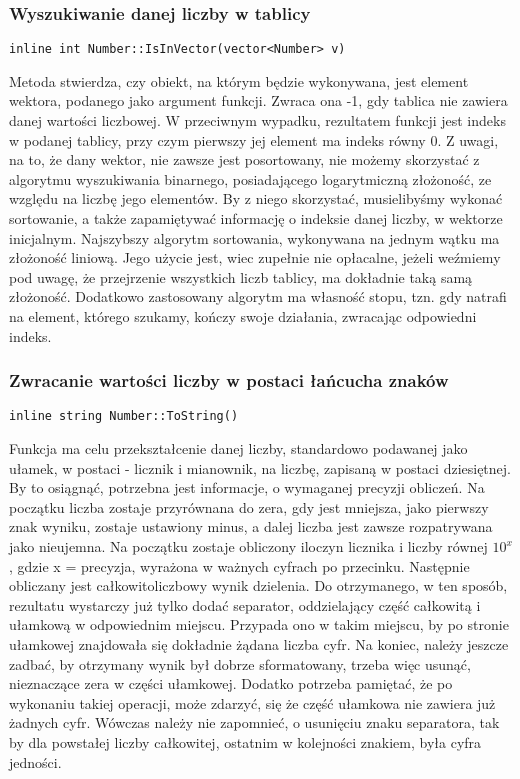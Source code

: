 \documentclass[twoside,a4paper]{book}
\begin{document}
\subsubsection{Wyszukiwanie danej liczby w tablicy}
\begin{lstlisting}
inline int Number::IsInVector(vector<Number> v)
\end{lstlisting}

Metoda stwierdza, czy obiekt, na którym będzie wykonywana, jest element wektora, podanego jako argument funkcji. Zwraca ona -1, gdy tablica nie zawiera danej wartości liczbowej. W przeciwnym wypadku, rezultatem funkcji jest indeks w podanej tablicy, przy czym pierwszy jej element ma indeks równy 0. Z uwagi, na to, że dany wektor, nie zawsze jest posortowany, nie możemy skorzystać z algorytmu wyszukiwania binarnego, posiadającego logarytmiczną złożoność, ze względu na liczbę jego elementów. By z niego skorzystać, musielibyśmy wykonać sortowanie, a także zapamiętywać informację o indeksie danej liczby, w wektorze inicjalnym. Najszybszy algorytm sortowania, wykonywana na jednym wątku ma złożoność liniową. Jego użycie jest, wiec zupełnie nie opłacalne, jeżeli weźmiemy pod uwagę, że przejrzenie wszystkich liczb tablicy, ma dokładnie taką samą złożoność. Dodatkowo zastosowany algorytm ma własność stopu, tzn. gdy natrafi na element, którego szukamy, kończy swoje działania, zwracając odpowiedni indeks.
\\

\subsubsection{Zwracanie wartości liczby w postaci łańcucha znaków}
\begin{lstlisting}
inline string Number::ToString()
\end{lstlisting}

Funkcja ma celu przekształcenie danej liczby, standardowo podawanej jako ułamek, w postaci - licznik i mianownik, na liczbę, zapisaną w postaci dziesiętnej. By to osiągnąć, potrzebna jest informacje, o wymaganej precyzji obliczeń. Na początku liczba zostaje przyrównana do zera, gdy jest mniejsza, jako pierwszy znak wyniku, zostaje ustawiony minus, a dalej liczba jest zawsze rozpatrywana jako nieujemna. Na początku zostaje obliczony iloczyn licznika i liczby równej $10^x$, gdzie x = precyzja, wyrażona w ważnych cyfrach po przecinku. Następnie obliczany jest całkowitoliczbowy wynik dzielenia. Do otrzymanego, w ten sposób, rezultatu wystarczy już tylko dodać separator, oddzielający część całkowitą i ułamkową w odpowiednim miejscu. Przypada ono w takim miejscu, by po stronie ułamkowej znajdowała się dokładnie żądana liczba cyfr. Na koniec, należy jeszcze zadbać, by otrzymany wynik był dobrze sformatowany, trzeba więc usunąć, nieznaczące zera w części ułamkowej. Dodatko potrzeba pamiętać, że po wykonaniu takiej operacji, może zdarzyć, się że część ułamkowa nie zawiera już żadnych cyfr. Wówczas należy nie zapomnieć, o usunięciu znaku separatora, tak by dla powstałej liczby całkowitej, ostatnim w kolejności znakiem, była cyfra jedności.
\\
\end{document}
